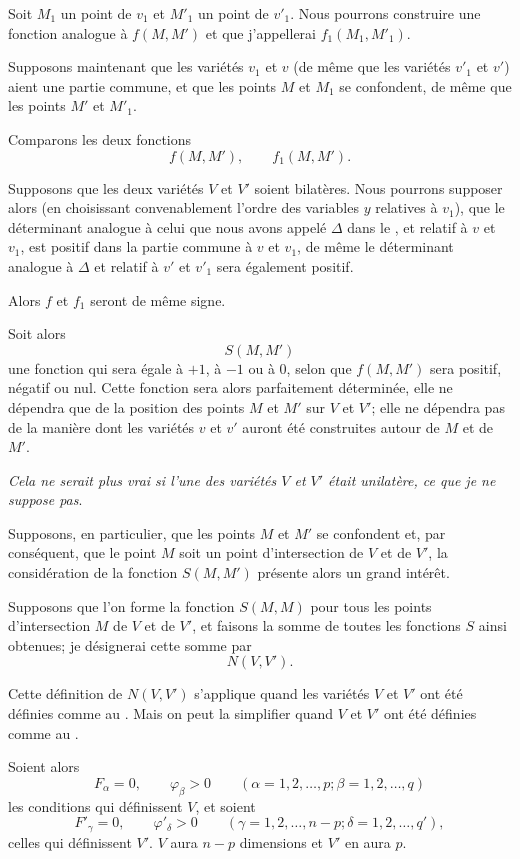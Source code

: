 \documentclass{article}
\begin{document}
Soit $M_{1}$ un point de $v_{1}$ et $M'_{1}$ un point de $v'_{1}$. Nous pourrons construire une fonction analogue à $f(M, M')$ et que j'appellerai $f_{1}(M_{1}, M'_{1})$.

Supposons maintenant que les variétés $v_{1}$ et $v$ (de même que les variétés $v'_{1}$ et $v'$) aient une partie commune, et que les points $M$ et $M_{1}$ se confondent, de même que les points $M'$ et $M'_{1}$.

Comparons les deux fonctions
\[
f(M, M'), \qquad f_{1}(M, M').
\]

Supposons que les deux variétés $V$ et $V'$ soient bilatères. Nous pourrons supposer alors (en choisissant convenablement l'ordre des variables $y$ relatives à $v_{1}$), que le déterminant analogue à celui que nous avons appelé $\Delta$ dans le , et relatif à $v$ et $v_{1}$, est positif dans la partie commune à $v$ et $v_{1}$, de même le déterminant analogue à $\Delta$ et relatif à $v'$ et $v'_{1}$ sera également positif.

Alors $f$ et $f_{1}$ seront de même signe.

Soit alors
\[
S(M, M')
\]
une fonction qui sera égale à $+1$, à $-1$ ou à 0, selon que $f(M, M')$ sera positif, négatif ou nul. Cette fonction sera alors parfaitement déterminée, elle ne dépendra que de la position des points $M$ et $M'$ sur $V$ et $V'$; elle ne dépendra pas de la manière dont les variétés $v$ et $v'$ auront été construites autour de $M$ et de $M'$.

\emph{Cela ne serait plus vrai si l'une des variétés $V$ et $V'$ était unilatère, ce que je ne suppose pas}.

Supposons, en particulier, que les points $M$ et $M'$ se confondent et, par conséquent, que le point $M$ soit un point d'intersection de $V$ et de $V'$, la considération de la fonction $S(M, M')$ présente alors un grand intérêt.

Supposons que l'on forme la fonction $S(M, M)$ pour tous les points d'intersection $M$ de $V$ et de $V'$, et faisons la somme de toutes les fonctions $S$ ainsi obtenues; je désignerai cette somme par
\[
N(V, V').
\]

Cette définition de $N(V, V')$ s'applique quand les variétés $V$ et $V'$ ont été définies comme au . Mais on peut la simplifier quand $V$ et $V'$ ont été définies comme au .

Soient alors
\[
F_{\alpha} = 0, \qquad \varphi_{\beta} > 0 \qquad (\alpha = 1, 2, \ldots, p; \beta = 1, 2, \ldots, q)
\]
les conditions qui définissent $V$, et soient
\[
F'_{\gamma} = 0, \qquad \varphi'_{\delta} > 0 \qquad (\gamma = 1, 2, \ldots, n-p; \delta = 1, 2, \ldots, q'),
\]
celles qui définissent $V'$. $V$ aura $n-p$ dimensions et $V'$ en aura $p$.
\end{document}
